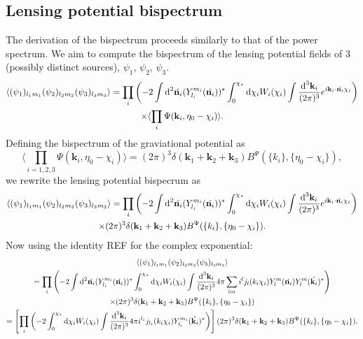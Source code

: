\documentclass[11pt]{article} %
\DeclareRobustCommand{\d}{\ifmmode\text{d}\else d\fi}
\newcommand{\br}[1]{\ensuremath{\left( #1 \right)}}
\newcommand{\sbr}[1]{\ensuremath{\left[ #1 \right]}}
\begin{document}
\subsection{Lensing potential bispectrum}
The derivation of the bispectrum proceeds similarly to that of the power spectrum. We aim to compute the bispectrum of the lensing potential fields of 3 (possibly distinct sources), $\psi_1$, $\psi_2$, $\psi_3$. 
\begin{gather*}
    \langle (\psi_1)_{l_1m_1}(\psi_2)_{l_2m_2}(\psi_3)_{l_3m_3} \rangle = 
    \prod_i\br{-2\int\d^2\hat{\mathbf n_i}(Y^{m_i}_{l_i}(\hat{\mathbf n_i}))^*\int_0^{\chi_*}\d\chi_i W_i(\chi_i)\int\frac{\d^3\mathbf k_i}{(2\pi)^{3}}e^{i\mathbf k_i \cdot\hat{\mathbf n_i}\chi_i}} \\
    \times \langle \prod_i\Psi(\mathbf k_i, \eta_0 - \chi_i) \rangle.
\end{gather*}
Defining the bispectrum of the graviational potential as
\begin{equation*}
    \langle \prod_{i=1,2,3}\Psi(\mathbf k_i, \eta_0 - \chi_i) \rangle = (2\pi)^3\delta(\mathbf k_1 + \mathbf k_2 + \mathbf k_3)B^\Psi(\{k_i\}, \{\eta_0-\chi_i\}),
\end{equation*}
we rewrite the lensing potential bispecrum as
\begin{gather*}
    \langle (\psi_1)_{l_1m_1}(\psi_2)_{l_2m_2}(\psi_3)_{l_3m_3} \rangle = 
    \prod_i\br{-2\int\d^2\hat{\mathbf n_i}(Y^{m_i}_{l_i}(\hat{\mathbf n_i}))^*\int_0^{\chi_*}\d\chi_i W_i(\chi_i)\int\frac{\d^3\mathbf k_i}{(2\pi)^{3}}e^{i\mathbf k_i \cdot\hat{\mathbf n_i}\chi_i}}\\ \times (2\pi)^3\delta(\mathbf k_1 + \mathbf k_2 + \mathbf k_3)B^\Psi(\{k_i\}, \{\eta_0-\chi_i\}).
\end{gather*}
Now using the identity REF for the complex exponential:
\begin{gather*}
    \langle (\psi_1)_{l_1m_1}(\psi_2)_{l_2m_2}(\psi_3)_{l_3m_3} \rangle \\ = 
    \prod_i\br{-2\int\d^2\hat{\mathbf n_i}(Y^{m_i}_{l_i}(\hat{\mathbf n_i}))^*\int_0^{\chi_*}\d\chi_i W_i(\chi_i)\int\frac{\d^3\mathbf k_i}{(2\pi)^{3}}4\pi\sum_{lm}i^{l}j_{l}(k_i\chi_i)Y_{l}^{m}(\hat{\mathbf n_i})Y_{l}^{m}(\hat{\mathbf k_i})^*}\\
    \times (2\pi)^3\delta(\mathbf k_1 + \mathbf k_2 + \mathbf k_3)B^\Psi(\{k_i\}, \{\eta_0-\chi_i\}) \\
    = \sbr{\prod_i\br{-2\int_0^{\chi_*}\d\chi_i W_i(\chi_i)\int\frac{\d^3\mathbf k_i}{(2\pi)^{3}}4\pi i^{l_i}j_{l_i}(k_i\chi_i)Y_{l_i}^{m_i}(\hat{\mathbf k_i})^*}} (2\pi)^3\delta(\mathbf k_1 + \mathbf k_2 + \mathbf k_3)B^\Psi(\{k_i\}, \{\eta_0-\chi_i\}).
\end{gather*}
\end{document}
